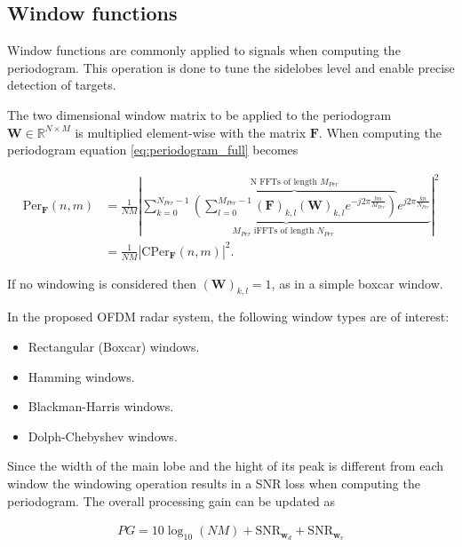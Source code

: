 	\subsection{Window functions}
	
	Window functions are commonly applied to signals when computing the periodogram. This operation is done to tune the sidelobes level and enable precise detection of targets. 
	
	
	The two dimensional window matrix to be applied to the periodogram $\bm{W} \in \mathbb{R}^{N\times M}$ is multiplied element-wise with the matrix $\bm{F}$. When computing the periodogram equation \ref{eq:periodogram_full} becomes
	
	
	   \begin{align}
		\text{Per}_{\bm{F}}(n,m) &= \frac{1}{NM} \left| \underbrace{ \sum_{k=0}^{N_{Per}-1}  \overbrace{\left( \sum_{l=0}^{M_{Per}-1} (\bm{F})_{k,l} (\bm{W})_{k,l} e^{-j2\pi \frac{lm}{M_{Per}}} \right)}^{\text{N FFTs of length $M_{Per}$}}  e^{j2\pi\frac{kn}{N_{Per}}}}_{ \text{$M_{Per}$ iFFTs of length $N_{Per}$ }} \right| ^ 2 \label{eq:periodogram_full_win}\\
		&= \frac{1}{NM} \left| \text{CPer}_{\bm{F}}(n,m) \right| ^ 2. \label{eq:periodogram_cper_win}
	\end{align}
	 
	 If no windowing is considered then $(\bm{W})_{k,l} = 1$, as in a simple boxcar window.
	 
	 In the proposed OFDM radar system, the following window types are of interest:
	 
	 \begin{itemize}
	 	\item Rectangular (Boxcar) windows.
	 	\item Hamming windows.
	 	\item Blackman-Harris windows.
	 	\item Dolph-Chebyshev windows.
	 \end{itemize}
	
	
	Since the width of the main lobe and the hight of its peak is different from each window the windowing operation results in a SNR loss when computing the periodogram.
	The overall processing gain can be updated as
	
	\begin{align}
		PG = 10\log_{10}(NM) + \text{SNR}_{\bm{w}_d} + \text{SNR}_{\bm{w}_v}
	\end{align}
	
